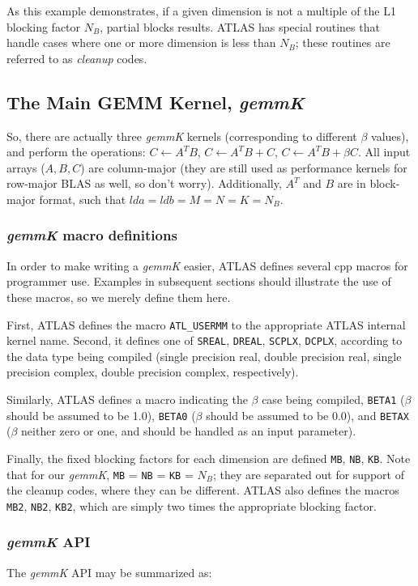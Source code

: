 \documentclass[11pt]{article}
\begin{document}
As this example demonstrates, if a given dimension is not a multiple of
the L1 blocking factor $N_B$, partial blocks results.  ATLAS has special
routines that handle cases where one or more dimension is less than $N_B$;
these routines are referred to as {\em cleanup} codes.

\subsection{The Main GEMM Kernel, {\it gemmK}}
So, there are actually three {\it gemmK} kernels (corresponding to different
$\beta$ values), and perform the operations:
$C \leftarrow A^T B$,
$C \leftarrow A^T B + C$,
$C \leftarrow A^T B + \beta C$.  All input arrays ($A, B, C$) are
column-major (they are still used as performance kernels for row-major
BLAS as well, so don't worry).  Additionally, $A^T$ and $B$ are in block-major
format, such that $lda = ldb = M = N = K = N_B$.

\subsubsection{{\it gemmK}  macro definitions}
In order to make writing a {\it gemmK} easier, ATLAS defines several 
cpp macros for programmer use.  Examples in subsequent sections should 
illustrate the use of these macros, so we merely define them here.

First, ATLAS defines the macro {\tt ATL\_USERMM}
to the appropriate ATLAS internal kernel name.  Second, it defines one
of  {\tt SREAL}, {\tt DREAL}, {\tt SCPLX}, {\tt DCPLX}, according to
the data type being compiled (single precision real, double precision
real, single precision complex, double precision complex, respectively).

Similarly, ATLAS defines a macro indicating the $\beta$ case being
compiled, {\tt BETA1} ($\beta$ should be assumed to be 1.0), {\tt BETA0}
($\beta$ should be assumed to be 0.0), and {\tt BETAX}
($\beta$ neither zero or one, and should be handled as an input parameter).

Finally, the fixed blocking factors for each dimension are defined
{\tt MB}, {\tt NB}, {\tt KB}.  Note that for our {\it gemmK},
{\tt MB} = {\tt NB} = {\tt KB} = $N_B$; they are separated out for
support of the cleanup codes, where they can be different.  ATLAS also
defines the macros {\tt MB2}, {\tt NB2}, {\tt KB2}, which are simply
two times the appropriate blocking factor. 

\subsubsection{{\it gemmK} API}
The {\it gemmK} API may be summarized as:
\end{document}
